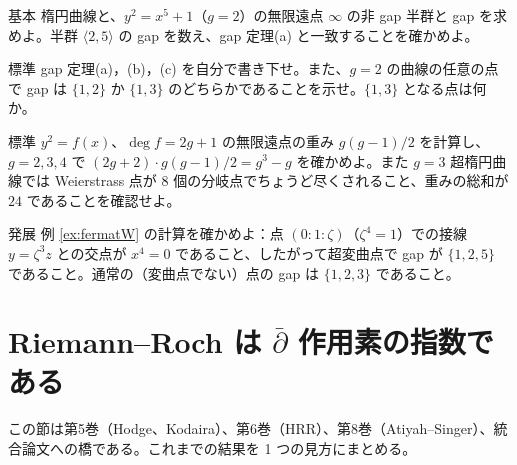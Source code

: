 \begin{prob}{基本}\label{p:gaps1}
楕円曲線と、$y^2=x^5+1$（$g=2$）の無限遠点 $\infty$ の非 gap 半群と gap を求めよ。半群 $\langle2,5\rangle$ の gap を数え、gap 定理(a) と一致することを確かめよ。
\end{prob}
\begin{prob}{標準}\label{p:gapproof}
gap 定理(a)，(b)，(c) を自分で書き下せ。また、$g=2$ の曲線の任意の点で gap は $\{1,2\}$ か $\{1,3\}$ のどちらかであることを示せ。$\{1,3\}$ となる点は何か。
\end{prob}
\begin{prob}{標準}\label{p:weight}
$y^2=f(x)$、$\deg f=2g+1$ の無限遠点の重み $g(g-1)/2$ を計算し、$g=2,3,4$ で $(2g+2)\cdot g(g-1)/2=g^3-g$ を確かめよ。また $g=3$ 超楕円曲線では Weierstrass 点が $8$ 個の分岐点でちょうど尽くされること、重みの総和が $24$ であることを確認せよ。
\end{prob}
\begin{prob}{発展}\label{p:fermatW}
例 \ref{ex:fermatW} の計算を確かめよ：点 $(0:1:\zeta)$（$\zeta^4=1$）での接線 $y=\zeta^3z$ との交点が $x^4=0$ であること、したがって超変曲点で gap が $\{1,2,5\}$ であること。通常の（変曲点でない）点の gap は $\{1,2,3\}$ であること。
\end{prob}

\section{Riemann--Roch は $\bar\partial$ 作用素の指数である}\label{sec:index}
この節は第5巻（Hodge、Kodaira）、第6巻（HRR）、第8巻（Atiyah--Singer）、統合論文への橋である。これまでの結果を 1 つの見方にまとめる。

